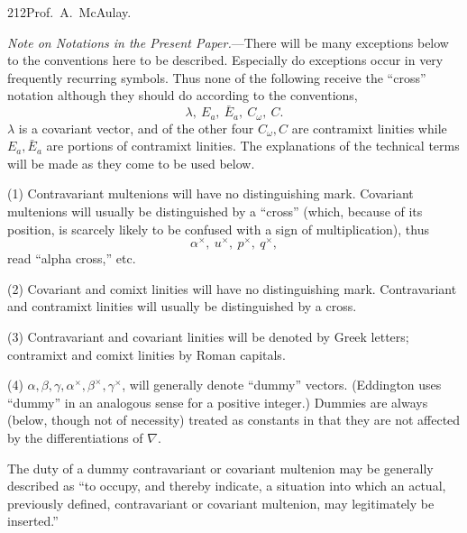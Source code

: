 \documentclass[11pt]{article}
\begin{document}
\newpage\thispagestyle{empty}\begin{center}212\hfill Prof.\ A.\ McAulay.\end{center}
\indent \emph{Note on Notations in the Present Paper.}---There will be many exceptions below to the conventions here to be described. Especially do exceptions occur in very frequently recurring symbols. Thus none of the following receive the ``cross'' notation although they should do according to the conventions,
\[
\lambda,\ E_a,\ \bar E_a,\ C_\omega,\ C.
\]
$\lambda$ is a covariant vector, and of the other four $C_\omega,C$ are contramixt linities while $E_a,\bar E_a$ are portions of contramixt linities. The explanations of the technical terms will be made as they come to be used below.

\indent (1) Contravariant multenions will have no distinguishing mark. Covariant multenions will usually be distinguished by a ``cross'' (which, because of its position, is scarcely likely to be confused with a sign of multiplication), thus
\[
\alpha^\times,\ u^\times,\ p^\times,\ q^\times,
\]
read ``alpha cross,'' etc.

\indent (2) Covariant and comixt linities will have no distinguishing mark. Contravariant and contramixt linities will usually be distinguished by a cross.

\indent (3) Contravariant and covariant linities will be denoted by Greek letters; contramixt and comixt linities by Roman capitals.

\indent (4) $\alpha,\beta,\gamma,\alpha^\times,\beta^\times,\gamma^\times$, will generally denote ``dummy'' vectors. (Eddington uses ``dummy'' in an analogous sense for a positive integer.) Dummies are always (below, though not of necessity) treated as constants in that they are not affected by the differentiations of $\nabla$.

\indent The duty of a dummy contravariant or covariant multenion may be generally described as ``to occupy, and thereby indicate, a situation into which an actual, previously defined, contravariant or covariant multenion, may legitimately be inserted.''
\end{document}
